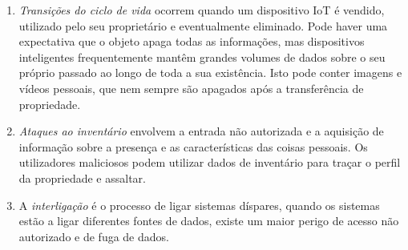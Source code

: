 \documentclass[conference]{IEEEtran}
\begin{document}
\begin{enumerate}
    \item
    \textit{Transições do ciclo de vida} ocorrem quando um dispositivo IoT
    é vendido, utilizado pelo seu proprietário e eventualmente eliminado.
    Pode haver uma expectativa que o objeto apaga todas as informações,
    mas dispositivos inteligentes frequentemente mantêm grandes volumes de
    dados sobre o seu próprio passado ao longo de toda a sua existência.
    Isto pode conter imagens e vídeos pessoais, que nem sempre são apagados
    após a transferência de propriedade.

    \item
    \textit{Ataques ao inventário} envolvem a entrada não autorizada e a
    aquisição de informação sobre a presença e as características das coisas
    pessoais. Os utilizadores maliciosos podem utilizar dados de inventário
    para traçar o perfil da propriedade e assaltar.

    \item
    A \textit{interligação} é o processo de ligar sistemas díspares, quando
    os sistemas estão a ligar diferentes fontes de dados, existe um maior
    perigo de acesso não autorizado e de fuga de dados.

\end{enumerate}
\end{document}
